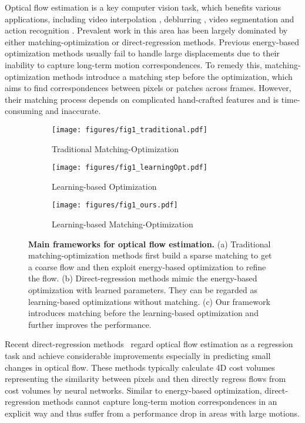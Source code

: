 \documentclass[10pt,twocolumn,letterpaper]{article}
\begin{document}
Optical flow estimation is a key computer vision task, which benefits various applications, including video interpolation \cite{jiang2018super}, deblurring \cite{yuan2020efficient}, video segmentation \cite{tsai2016video} and action recognition \cite{simonyan2014two}. 
Prevalent work in this area has been largely dominated by either matching-optimization or direct-regression methods.
Previous energy-based optimization methods \cite{horn1981determining,brox2004high,papenberg2006highly} usually fail to handle large displacements due to their inability to capture long-term motion correspondences. 
To remedy this, matching-optimization methods \cite{brox2010large,weinzaepfel2013deepflow,bailer2015flow} introduce a matching step before the optimization, which aims to find correspondences between pixels or patches across frames. 
However, their matching process depends on complicated hand-crafted features and is time-consuming and inaccurate. 


\begin{figure}
  \centering
  \begin{subfigure}{1\linewidth}
    \centering
        \texttt{[image: figures/fig1\_traditional.pdf]}
    \caption{Traditional Matching-Optimization}
    \label{fig:matching}
  \end{subfigure}
  \begin{subfigure}{1\linewidth}
    \centering
        \texttt{[image: figures/fig1\_learningOpt.pdf]}
    \caption{Learning-based Optimization}
    \label{fig:learning}
  \end{subfigure}
  \begin{subfigure}{1\linewidth}
    \centering
        \texttt{[image: figures/fig1\_ours.pdf]}
    \caption{Learning-based Matching-Optimization}
    \label{fig:ours}
  \end{subfigure}
  \caption{\textbf{Main frameworks for optical flow estimation.} (a) Traditional matching-optimization methods first build a sparse matching to get a coarse flow and then exploit energy-based optimization to refine the flow. (b) Direct-regression methods mimic the energy-based optimization with learned parameters. They can be regarded as learning-based optimizations without matching. (c) Our framework introduces matching before the learning-based optimization and further improves the performance.
  }\label{fig:fig1}
\end{figure}


Recent direct-regression methods~\cite{sun2018pwc,hui2018liteflownet,teed2020raft,zhang2021separable} regard optical flow estimation as a regression task and achieve considerable improvements especially in predicting small changes in optical flow. These methods typically calculate 4D cost volumes representing the similarity between pixels and then directly regress flows from cost volumes by neural networks.
Similar to energy-based optimization, direct-regression methods cannot capture long-term motion correspondences in an explicit way and thus suffer from a performance drop in areas with large motions.
\end{document}
